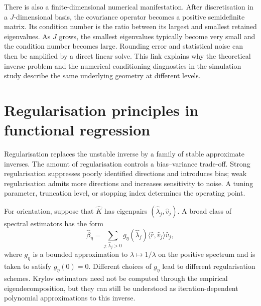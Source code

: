 There is also a finite-dimensional numerical manifestation. After discretisation in a $J$-dimensional basis, the covariance operator becomes a positive semidefinite matrix. Its condition number is the ratio between its largest and smallest retained eigenvalues. As $J$ grows, the smallest eigenvalues typically become very small and the condition number becomes large. Rounding error and statistical noise can then be amplified by a direct linear solve. This link explains why the theoretical inverse problem and the numerical conditioning diagnostics in the simulation study describe the same underlying geometry at different levels.

\section{Regularisation principles in functional regression}
\label{sec:regularisation-principles}

Regularisation replaces the unstable inverse by a family of stable approximate inverses. The amount of regularisation controls a bias--variance trade-off. Strong regularisation suppresses poorly identified directions and introduces bias; weak regularisation admits more directions and increases sensitivity to noise. A tuning parameter, truncation level, or stopping index determines the operating point.

For orientation, suppose that $\widehat K$ has eigenpairs $(\widehat\lambda_j,\widehat v_j)$. A broad class of spectral estimators has the form
\begin{equation}
    \widehat\beta_{\eta}
    =\sum_{j:\widehat\lambda_j>0} g_{\eta}(\widehat\lambda_j)
      \langle\widehat r,\widehat v_j\rangle\widehat v_j,
    \label{eq:spectral-filter-estimator}
\end{equation}
where $g_{\eta}$ is a bounded approximation to $\lambda\mapsto1/\lambda$ on the positive spectrum and is taken to satisfy $g_{\eta}(0)=0$. Different choices of $g_{\eta}$ lead to different regularisation schemes. Krylov estimators need not be computed through the empirical eigendecomposition, but they can still be understood as iteration-dependent polynomial approximations to this inverse.

